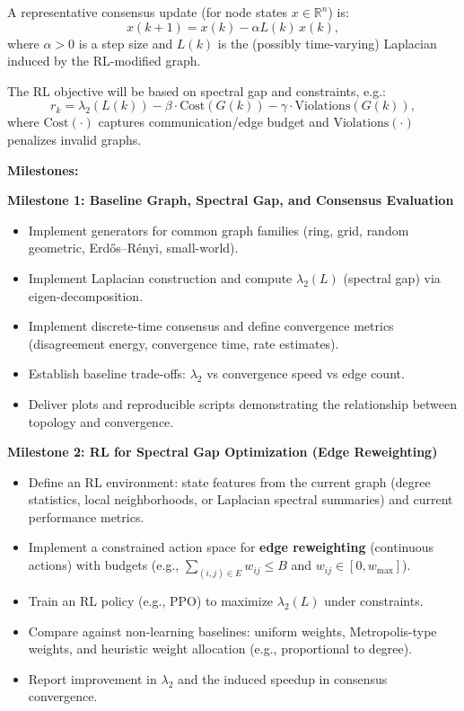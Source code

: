 \documentclass[11pt, letterpaper]{article}
\begin{document}
A representative consensus update (for node states $x \in \mathbb{R}^n$) is:
\[
x(k+1) = x(k) - \alpha L(k)\,x(k),
\]
where $\alpha>0$ is a step size and $L(k)$ is the (possibly time-varying) Laplacian induced by the RL-modified graph.

The RL objective will be based on spectral gap and constraints, e.g.:
\[
r_k = \lambda_2(L(k)) - \beta \cdot \text{Cost}(G(k)) - \gamma \cdot \text{Violations}(G(k)),
\]
where $\text{Cost}(\cdot)$ captures communication/edge budget and $\text{Violations}(\cdot)$ penalizes invalid graphs.

\vspace{0.4cm}

\textbf{Milestones:}

\textbf{Milestone 1: Baseline Graph, Spectral Gap, and Consensus Evaluation}  
\begin{itemize}[leftmargin=1.2em]
    \item Implement generators for common graph families (ring, grid, random geometric, Erd\H{o}s--R\'enyi, small-world).
    \item Implement Laplacian construction and compute $\lambda_2(L)$ (spectral gap) via eigen-decomposition.
    \item Implement discrete-time consensus and define convergence metrics (disagreement energy, convergence time, rate estimates).
    \item Establish baseline trade-offs: $\lambda_2$ vs convergence speed vs edge count.
    \item Deliver plots and reproducible scripts demonstrating the relationship between topology and convergence.
\end{itemize}

\textbf{Milestone 2: RL for Spectral Gap Optimization (Edge Reweighting)}  
\begin{itemize}[leftmargin=1.2em]
    \item Define an RL environment: state features from the current graph (degree statistics, local neighborhoods, or Laplacian spectral summaries) and current performance metrics.
    \item Implement a constrained action space for \textbf{edge reweighting} (continuous actions) with budgets (e.g., $\sum_{(i,j)\in E} w_{ij}\le B$ and $w_{ij}\in[0,w_{\max}]$).
    \item Train an RL policy (e.g., PPO) to maximize $\lambda_2(L)$ under constraints.
    \item Compare against non-learning baselines: uniform weights, Metropolis-type weights, and heuristic weight allocation (e.g., proportional to degree).
    \item Report improvement in $\lambda_2$ and the induced speedup in consensus convergence.
\end{itemize}
\end{document}
